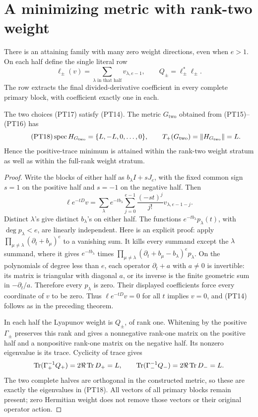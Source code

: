 \section{A minimizing metric with rank-two weight}

There is an attaining family with many zero weight directions,
even when \(e>1\). On each half define the single literal row
\begin{equation}\tag{PT17}
 \ell_\pm(v)=\sum_{\lambda\text{ in that half}}v_{\lambda,e-1},
 \qquad Q_\pm=\ell_\pm^*\ell_\pm.
\end{equation}
The row extracts the final divided-derivative coefficient in every
complete primary block, with coefficient exactly one in each.

\begin{proposition}
The two choices (PT17) satisfy (PT14). The metric
\(G_{\mathrm{two}}\) obtained from (PT15)--(PT16) has
\begin{equation}\tag{PT18}
 \operatorname{spec} H_{G_{\mathrm{two}}}=\{L,-L,0,\ldots,0\},\qquad
 T_+(G_{\mathrm{two}})=\left\lVert H_{G_{\mathrm{two}}}\right\rVert=L.
\end{equation}
Hence the positive-trace minimum is attained within the rank-two
weight stratum as well as within the full-rank weight stratum.
\end{proposition}
\begin{proof}
Write the blocks of either half as \(b_\lambda I+sJ_e\), with
the fixed common sign \(s=1\) on the positive half and \(s=-1\)
on the negative half. Then
\[
 \ell e^{-tD}v
 =\sum_\lambda e^{-tb_\lambda}
      \sum_{j=0}^{e-1}\frac{(-st)^j}{j!}v_{\lambda,e-1-j}.
\]
Distinct \(\lambda\)'s give distinct \(b_\lambda\)'s on
either half. The functions \(e^{-tb_\lambda}p_\lambda(t)\),
with \(\deg p_\lambda<e\), are linearly independent. Here is
an explicit proof: apply
\(\prod_{\mu\ne\lambda}(\partial_t+b_\mu)^e\) to a
vanishing sum. It kills every summand except the \(\lambda\)
summand, where it gives \(e^{-tb_\lambda}\) times
\(\prod_{\mu\ne\lambda}(\partial_t+b_\mu-b_\lambda)^e
p_\lambda\). On the polynomials of degree less than \(e\),
each operator \(\partial_t+a\) with \(a\ne0\) is invertible:
its matrix is triangular with diagonal \(a\), or its inverse
is the finite geometric sum in \(-\partial_t/a\).
Therefore every \(p_\lambda\) is zero. Their displayed
coefficients force every coordinate of \(v\) to be zero.
Thus \(\ell e^{-tD}v=0\) for all \(t\) implies \(v=0\),
and (PT14) follows as in the preceding theorem.

In each half the Lyapunov weight is \(Q_\pm\), of rank one.
Whitening by the positive \(\Gamma_\pm\) preserves this rank
and gives a nonnegative rank-one matrix on the positive half
and a nonpositive rank-one matrix on the negative half. Its
nonzero eigenvalue is its trace. Cyclicity of trace gives
\[
 \operatorname{Tr}(\Gamma_+^{-1}Q_+)=2\Re\operatorname{Tr} D_+=L,
 \qquad\operatorname{Tr}(\Gamma_-^{-1}Q_-)=2\Re\operatorname{Tr} D_-=L.
\]
The two complete halves are orthogonal in the constructed metric,
so these are exactly the eigenvalues in (PT18). All vectors of
all primary blocks remain present; zero Hermitian weight does not
remove those vectors or their original operator action.
\end{proof}

